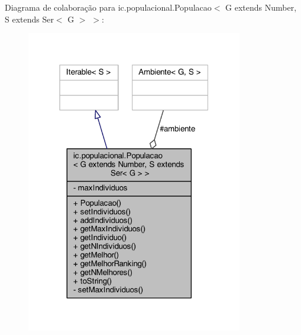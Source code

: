 Diagrama de colaboração para ic.\-populacional.\-Populacao$<$ G extends Number, S extends Ser$<$ G $>$ $>$\-:\nopagebreak
\begin{figure}[H]
\begin{center}
\leavevmode
\includegraphics[width=268pt]{classic_1_1populacional_1_1_populacao_3_01_g_01extends_01_number_00_01_s_01extends_01_ser_3_01_g_01_4_01_4__coll__graph}
\end{center}
\end{figure}
